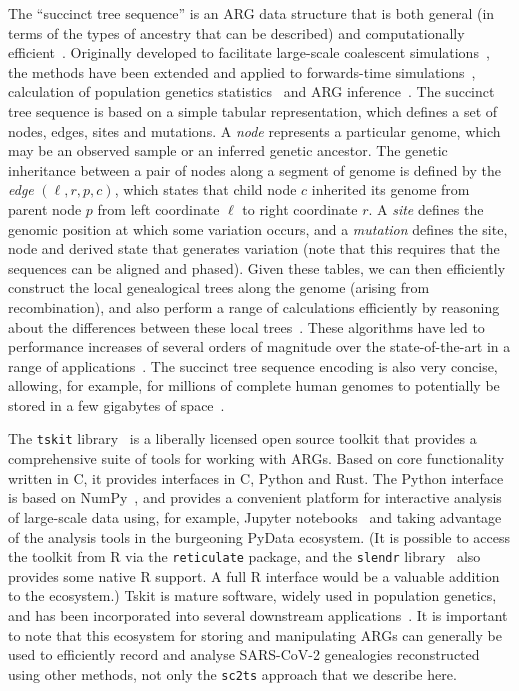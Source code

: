 \documentclass{article}
\begin{document}
The ``succinct tree sequence'' is an ARG data structure
that is both general (in terms of the types of ancestry that can
be described) and computationally efficient~\citep{Wong2023-efficient}.
Originally developed to facilitate large-scale coalescent
simulations~\citep{Kelleher2016-wk}, the methods have been
extended and applied to forwards-time
simulations~\citep{Kelleher2018-xc,Haller2018-tree},
calculation of population genetics statistics~\citep{Ralph2020-efficiently}
and ARG inference~\citep{Kelleher2019-ba,Wohns2022-th}.
The succinct tree sequence is based on a simple tabular representation,
which defines a set of nodes, edges, sites and mutations. A \emph{node}
represents a particular genome, which may be an observed sample
or an inferred genetic ancestor. The genetic inheritance between
a pair of nodes along a segment of genome is defined by
the \emph{edge} $(\ell, r, p, c)$, which states that
child node $c$ inherited its genome from parent node $p$
from left coordinate $\ell$ to right coordinate $r$. A \emph{site}
defines the genomic position at which some variation occurs,
and a \emph{mutation} defines the site, node and derived state
that generates variation (note that this requires that the sequences can be aligned and phased).
Given these tables, we can then efficiently construct the local
genealogical trees along the genome (arising from recombination),
and also perform a range of calculations efficiently by
reasoning about the differences between these local
trees~\citep{Kelleher2016-wk,Ralph2020-efficiently}. These
algorithms have led to performance increases of several orders
of magnitude over the state-of-the-art in a range of
applications~\citep{Kelleher2016-wk,Kelleher2018-xc,Kelleher2019-ba,
Ralph2020-efficiently,Baumdicker2022-ep}.
The succinct tree sequence encoding
is also very concise, allowing, for example, for millions of
complete human genomes to potentially be stored in a few gigabytes of
space~\citep{Kelleher2019-ba}.

The \texttt{tskit} library~\citep{Tskit2023-tskit} is a liberally
licensed open source toolkit that provides a comprehensive suite
of tools for working with ARGs. Based on core functionality written
in C, it provides interfaces in C, Python and Rust. The Python interface
is based on NumPy~\citep{Harris2020-array}, and provides a convenient
platform for interactive analysis of large-scale data using, for
example, Jupyter notebooks~\citep{Kluyver2016-jupyter} and taking
advantage of the analysis tools in the burgeoning PyData ecosystem.
(It is possible to access the toolkit from R via the \texttt{reticulate}
package, and the \texttt{slendr} library~\citep{Petr2022-slendr}
also provides some native R support. A full R interface would be a
valuable addition to the ecosystem.)
Tskit is mature software, widely used in population genetics, and
has been incorporated into several downstream
applications~\citep[e.g.][]{Haller2019-slim,Speidel2019-yh,
Terasaki2021-geonomics,
Fan2022-genealogical,Korfmann2022-weak,
Mahmoudi2022-bayesian,Petr2022-slendr,Rasmussen2022-espalier}.
It is important to note that
this ecosystem for storing and manipulating ARGs can
generally be used to efficiently record and analyse SARS-CoV-2 genealogies reconstructed
using other methods, not only the \texttt{sc2ts} approach that we describe here.
\end{document}

